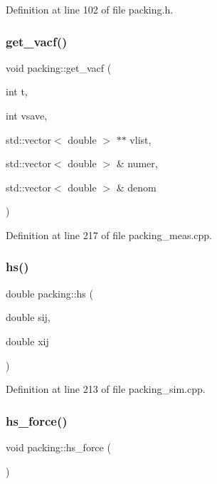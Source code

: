 Definition at line 102 of file packing.\+h.

\mbox{\label{classpacking_ab91f79587ed1579f6754e956e7939597}} 
\subsubsection{\texorpdfstring{get\+\_\+vacf()}{get\_vacf()}}
{\footnotesize\ttfamily void packing\+::get\+\_\+vacf (\begin{DoxyParamCaption}\item[{int}]{t,  }\item[{int}]{vsave,  }\item[{std\+::vector$<$ double $>$ $\ast$$\ast$}]{vlist,  }\item[{std\+::vector$<$ double $>$ \&}]{numer,  }\item[{std\+::vector$<$ double $>$ \&}]{denom }\end{DoxyParamCaption})}



Definition at line 217 of file packing\+\_\+meas.\+cpp.

\mbox{\label{classpacking_a87346c3bda1750e3a75fcb626ccaf82f}} 
\subsubsection{\texorpdfstring{hs()}{hs()}}
{\footnotesize\ttfamily double packing\+::hs (\begin{DoxyParamCaption}\item[{double}]{sij,  }\item[{double}]{xij }\end{DoxyParamCaption})}



Definition at line 213 of file packing\+\_\+sim.\+cpp.

\mbox{\label{classpacking_a2506d13784217eda51bcb99b6005c94d}} 
\subsubsection{\texorpdfstring{hs\+\_\+force()}{hs\_force()}}
{\footnotesize\ttfamily void packing\+::hs\+\_\+force (\begin{DoxyParamCaption}{ }\end{DoxyParamCaption})}




